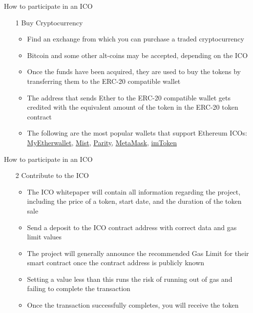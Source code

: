 \documentclass[11pt]{beamer}
\begin{document}


\begin{frame}{How to participate in an ICO}
	\begin{enumerate}
		\item[1] Buy Cryptocurrency
		\begin{itemize}
			\item Find an exchange from which you can purchase a traded cryptocurrency
			\item Bitcoin and some other alt-coins may be accepted, depending on the ICO
			\item Once the funds have been acquired, they are used to buy the tokens by transferring them to the ERC-20 compatible wallet
			\item The address that sends Ether to the ERC-20 compatible wallet gets credited with the equivalent amount of the token in the ERC-20 token contract
			\item The following are the most popular wallets that support Ethereum ICOs: \href{https://www.myetherwallet.com/}{MyEtherwallet}, \href{https://github.com/ethereum/mist/releases}{Mist}, \href{https://ethcore.io/parity.html}{Parity}, \href{https://metamask.io/}{MetaMask}, \href{https://itunes.apple.com/us/app/imtoken/id1153230571?ls=1&mt=8}{imToken}
		\end{itemize}
	\end{enumerate}
\end{frame}


\begin{frame}{How to participate in an ICO}
	\begin{enumerate}
		\item[2] Contribute to the ICO
		\begin{itemize}
			\item The ICO whitepaper will contain all information regarding the project, including the price of a token, start date, and the duration of the token sale
			\item Send a deposit to the ICO contract address with correct data and gas limit values
			\item The project will generally announce the recommended Gas Limit for their smart contract once the contract address is publicly known
			\item Setting a value less than this runs the risk of running out of gas and failing to complete the transaction
			\item Once the transaction successfully completes, you will receive the token
		\end{itemize}
	\end{enumerate}
\end{frame}
\end{document}
